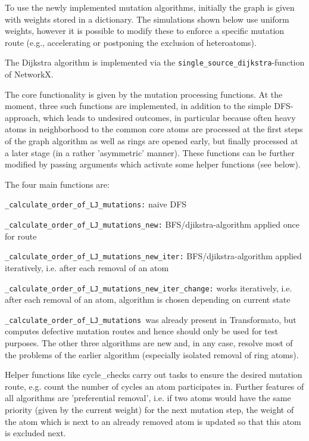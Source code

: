 To use the newly implemented mutation algorithms, initially the graph
is given with weights stored in a dictionary. The simulations shown
below use uniform weights, however it is possible to modify these to
enforce a specific mutation route (e.g., accelerating or postponing
the exclusion of heteroatoms). 

The Dijkstra algorithm is implemented via the \texttt{single\_source\_dijkstra}-function
of NetworkX.

The core functionality is given by the mutation processing functions.
At the moment, three such functions are implemented, in addition to
the simple DFS-approach, which leads to undesired outcomes, in particular because often heavy atoms in neighborhood to the common core atoms are processed at the first steps of the graph algorithm as well as rings are opened early, but finally processed at a later stage (in a rather 'asymmetric' manner). These functions
can be further modified by passing arguments which activate some helper
functions (see below).

The four main functions are: 

\texttt{\_calculate\_order\_of\_LJ\_mutations:} naive DFS 

\texttt{\_calculate\_order\_of\_LJ\_mutations\_new:} BFS/djikstra-algorithm
applied once for route

\texttt{\_calculate\_order\_of\_LJ\_mutations\_new\_iter:} BFS/djikstra-algorithm
applied iteratively, i.e. after each removal of an atom 

\texttt{\_calculate\_order\_of\_LJ\_mutations\_new\_iter\_change:}
works iteratively, i.e. after each removal of an atom, algorithm is
chosen depending on current state

\texttt{\_calculate\_order\_of\_LJ\_mutations }was already present in Transformato, but computes defective mutation routes and hence
should only be used for test purposes. The other three algorithms
are new and, in any case, resolve most of the problems of the earlier
algorithm (especially isolated removal of ring atoms).

Helper functions like cycle\_checks carry out tasks to ensure the
desired mutation route, e.g. count the number of cycles an atom participates
in. Further features of all algorithms are 'preferential removal',
i.e. if two atoms would have the same priority (given by the current
weight) for the next mutation step, the weight of the atom which is
next to an already removed atom is updated so that this atom is excluded
next.

